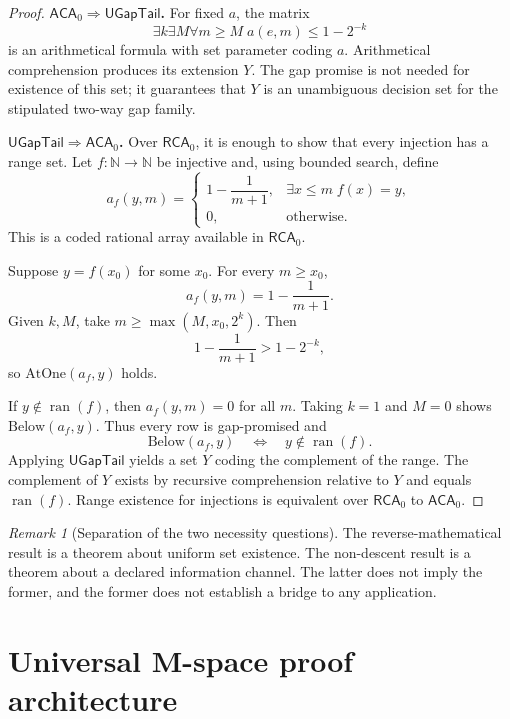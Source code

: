 \documentclass[11pt]{article}
\newcommand{\RCA}{\ensuremath{\mathsf{RCA}_0}}
\newcommand{\ACA}{\ensuremath{\mathsf{ACA}_0}}
\newcommand{\UGapTail}{\ensuremath{\mathsf{UGapTail}}}
\newcommand{\ran}{\ensuremath{\operatorname{ran}}}
\theoremstyle{plain}
\theoremstyle{definition}
\theoremstyle{remark}
\newtheorem{remark}[theorem]{Remark}
\begin{document}
\begin{proof}
\medskip\noindent\textbf{\(\ACA\Rightarrow\UGapTail\).}
For fixed $a$, the matrix
\[
\exists k\exists M\forall m\geq M\;a(e,m)\leq1-2^{-k}
\]
is an arithmetical formula with set parameter coding $a$.  Arithmetical
comprehension produces its extension $Y$.  The gap promise is not needed for
existence of this set; it guarantees that $Y$ is an unambiguous decision set for
the stipulated two-way gap family.

\medskip\noindent\textbf{\(\UGapTail\Rightarrow\ACA\).}
Over $\RCA$, it is enough to show that every injection has a range set.  Let
$f:\mathbb N\to\mathbb N$ be injective and, using bounded search, define
\[
a_f(y,m)=
\begin{cases}
1-\dfrac{1}{m+1},&\exists x\leq m\;f(x)=y,\\[1ex]
0,&\text{otherwise.}
\end{cases}
\]
This is a coded rational array available in $\RCA$.

Suppose $y=f(x_0)$ for some $x_0$.  For every $m\geq x_0$,
\[
a_f(y,m)=1-\frac{1}{m+1}.
\]
Given $k,M$, take $m\geq\max(M,x_0,2^k)$.  Then
\[
1-\frac{1}{m+1}>1-2^{-k},
\]
so $\mathrm{AtOne}(a_f,y)$ holds.

If $y\notin\ran(f)$, then $a_f(y,m)=0$ for all $m$.  Taking $k=1$ and $M=0$
shows $\mathrm{Below}(a_f,y)$.  Thus every row is gap-promised and
\[
\mathrm{Below}(a_f,y)\quad\Longleftrightarrow\quad y\notin\ran(f).
\]
Applying $\UGapTail$ yields a set $Y$ coding the complement of the range.  The
complement of $Y$ exists by recursive comprehension relative to $Y$ and equals
$\ran(f)$.  Range existence for injections is equivalent over $\RCA$ to $\ACA$.
\end{proof}

\begin{remark}[Separation of the two necessity questions]
The reverse-mathematical result is a theorem about uniform set existence.  The
non-descent result is a theorem about a declared information channel.  The latter
does not imply the former, and the former does not establish a bridge to any
application.
\end{remark}

\section{Universal M-space proof architecture}
\label{sec:target}
\end{document}
